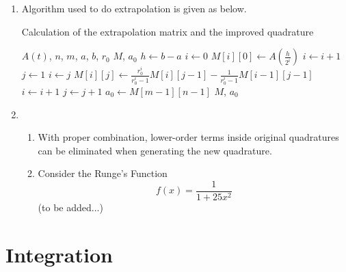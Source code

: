 \documentclass[paper=a4, fontsize=11pt]{scrartcl} %
\numberwithin{equation}{section} %
\numberwithin{figure}{section} %
\numberwithin{table}{section} %
\begin{document}
\begin{enumerate}
\begin{enumerate}
		\end{enumerate}
	\item
		Algorithm used to do extrapolation is given as below.
		
		\begin{algorithm}
		\caption{Calculation of the extrapolation matrix and the improved quadrature}
			\begin{algorithmic}[1]
				\REQUIRE $A(t)$, $n$, $m$, $a$, $b$, $r_0$
				\ENSURE $M$, $a_0$
				\STATE $h \gets b-a$
				\STATE $i \gets 0$
					\STATE $M[i][0] \gets A(\frac{h}{2^i})$
					\STATE $i \gets i + 1$
				\ENDWHILE
				\STATE $j \gets 1$
					\STATE $i \gets j$
						\STATE $M[i][j] \gets \frac{r_0^i}{r_0^i - 1} M[i][j-1] - \frac{1}{r_0^i -1} M[i-1][j-1]$
						\STATE $i \gets i+1$
					\ENDWHILE
					\STATE $j \gets j+1$
				\ENDWHILE
				\STATE $a_0 \gets M[m-1][n-1]$
				\RETURN $M$, $a_0$
			\end{algorithmic}
		\end{algorithm}
	
	\item
		\begin{enumerate}
			\item 
				With proper combination, lower-order terms inside original quadratures can be eliminated when generating the new quadrature.
			\item 
				Consider the Runge's Function
				\begin{equation}
					f(x) = \frac{1}{1+25x^2}
				\end{equation}
				(to be added...)
		\end{enumerate}
	
\end{enumerate}


\section{Integration}


	
\end{document}
